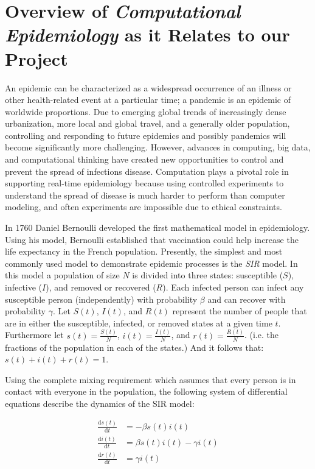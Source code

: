 \documentclass[12pt, oneside, openany]{article} %
\newcommand{\deriv}[2]{\frac{\mathrm d #1}{\mathrm d #2}}
\begin{document}

\tableofcontents
\newpage

\section{Overview of \textit{Computational Epidemiology} as it Relates to our Project}
An epidemic can be characterized as a widespread occurrence of an illness or other health-related event at a particular time; a pandemic is an epidemic of worldwide proportions. Due to emerging global trends of increasingly dense urbanization, more local and global travel, and a generally older population, controlling and responding to future epidemics and possibly pandemics will become significantly more challenging. However, advances in computing, big data, and computational thinking have created new opportunities to control and prevent the spread of infections disease. Computation plays a pivotal role in supporting real-time epidemiology because using controlled experiments to understand the spread of disease is much harder to perform than computer modeling, and often experiments are impossible due to ethical constraints. 

In 1760 Daniel Bernoulli developed the first mathematical model in epidemiology. Using his model, Bernoulli established that vaccination could help increase the life expectancy in the French population. Presently, the simplest and most commonly used model to demonstrate epidemic processes is the \emph{SIR} model. In this model a population of size $N$ is divided into three states: susceptible ($S$), infective ($I$), and removed or recovered ($R$). Each infected person can infect any susceptible person (independently) with probability $\beta$ and can recover with probability $\gamma$. Let $S(t)$, $I(t)$, and $R(t)$ represent the number of people that are in either the susceptible, infected, or removed states at a given time $t$. Furthermore let $s(t) = \frac{S(t)}{N}$, $i(t) = \frac{I(t)}{N}$, and $r(t) = \frac{R(t)}{N}$. (i.e. the fractions of the population in each of the states.) And it follows that: $s(t) + i(t) + r(t) = 1$. 

Using the complete mixing requirement which assumes that every person is in contact with everyone in the population, the following system of differential equations describe the dynamics of the SIR model:

\begin{align}
	\deriv{s(t)}{t} &= -\beta s(t) i(t) \\
	\deriv{i(t)}{t} &= \beta s(t) i(t) - \gamma i(t) \\
	\deriv{r(t)}{t} &= \gamma i(t)
\end{align}
\end{document}
